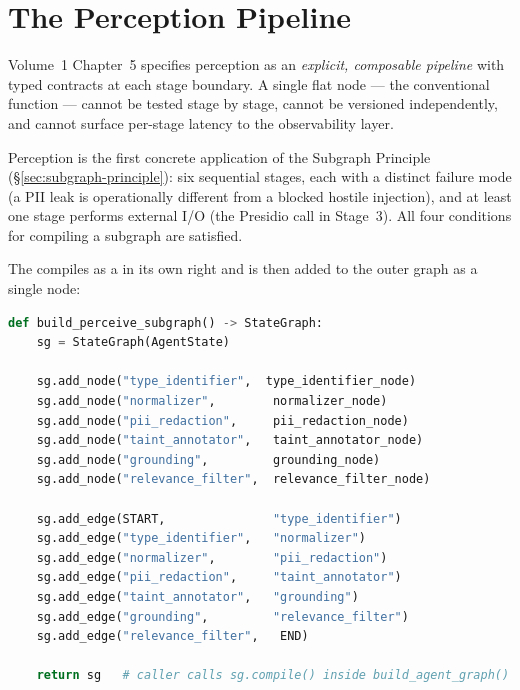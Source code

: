 \section{The Perception Pipeline}
\label{sec:perceive-subgraph}

Volume~1 Chapter~5 specifies perception as an \emph{explicit, composable
pipeline} with typed contracts at each stage boundary.  A single flat node
--- the conventional  function --- cannot be
tested stage by stage, cannot be versioned independently, and cannot surface
per-stage latency to the observability layer.

Perception is the first concrete application of the Subgraph Principle
(§\ref{sec:subgraph-principle}): six sequential stages, each with a
distinct failure mode (a PII leak is operationally different from a
blocked hostile injection), and at least one stage performs external I/O
(the Presidio call in Stage~3).  All four conditions for compiling a
subgraph are satisfied.

The  compiles as a  in its
own right and is then added to the outer graph as a single node:

\begin{lstlisting}[language=Python,
    caption={Six-stage PerceiveSubgraph assembly (src/perceive.py)},
    label={lst:perceive-subgraph}]
def build_perceive_subgraph() -> StateGraph:
    sg = StateGraph(AgentState)

    sg.add_node("type_identifier",  type_identifier_node)
    sg.add_node("normalizer",        normalizer_node)
    sg.add_node("pii_redaction",     pii_redaction_node)
    sg.add_node("taint_annotator",   taint_annotator_node)
    sg.add_node("grounding",         grounding_node)
    sg.add_node("relevance_filter",  relevance_filter_node)

    sg.add_edge(START,               "type_identifier")
    sg.add_edge("type_identifier",   "normalizer")
    sg.add_edge("normalizer",        "pii_redaction")
    sg.add_edge("pii_redaction",     "taint_annotator")
    sg.add_edge("taint_annotator",   "grounding")
    sg.add_edge("grounding",         "relevance_filter")
    sg.add_edge("relevance_filter",   END)

    return sg   # caller calls sg.compile() inside build_agent_graph()
\end{lstlisting}


